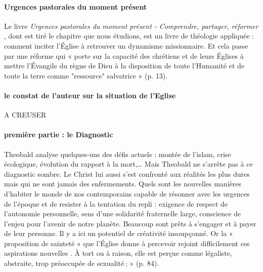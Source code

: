\paragraph{Urgences pastorales du moment présent} Le livre \textit{Urgences pastorales du moment présent - Comprendre, partager, réformer} \cite{theobald_urgences_2017}, dont est tiré le chapitre que nous étudions, est un livre de théologie appliquée :   comment inciter l’Église à retrouver un dynamisme missionnaire. Et cela passe par une réforme qui « porte sur la capacité des chrétiens et de leurs Églises à mettre l’Évangile du règne de Dieu à la disposition de toute l’Humanité et de toute la terre comme "ressource" salvatrice » (p. 13).

\paragraph{le constat de l'auteur sur la situation de l'Eglise}  \cite[p 26-29]{theobald_urgences_2017} A CREUSER 

 \paragraph{première partie : le Diagnostic } Theobald analyse quelques-uns des défis actuels : montée de l’islam, crise écologique, évolution du rapport à la mort,… Mais Theobald ne s'arrête pas à ce diagnostic sombre.  Le Christ lui aussi s'est confronté aux réalités les plus dures mais qui ne sont jamais des enfermements. Quels sont les nouvelles manières d’habiter le monde de nos contemporains capable de résonner avec les urgences de l’époque et de resister à la tentation du repli : exigence de respect de l’autonomie personnelle,  sens d’une solidarité fraternelle large,  conscience de l'enjeu pour l’avenir de notre planète. Beaucoup  sont prêts à s’engager et à payer de leur personne. Il y a ici un potentiel de créativité insoupçonné. Or la « proposition de sainteté » que l’Église donne à percevoir rejoint difficilement ces aspirations nouvelles . À tort ou à raison, elle est perçue comme légaliste, abstraite, trop préoccupée de sexualité ;  » (p. 84). 

